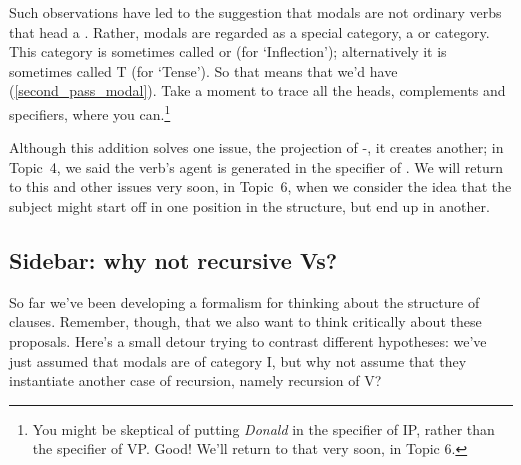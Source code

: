 \documentclass{article}
\begin{document}
Such observations have led to the suggestion that modals are not ordinary verbs that head a .
Rather, modals are regarded as a special category, a  or  category.
This category is sometimes called  or  (for `Inflection');  alternatively it is sometimes called T (for `Tense').
So that means that
we'd have (\ref{second_pass_modal}). Take a moment to trace all the heads, complements and specifiers, where you can.\footnote{You might be skeptical of putting \emph{Donald} in the specifier of IP, rather than the specifier of VP. Good! We'll return to that very soon, in Topic 6.}
\begin{exe}
    \label{second_pass_modal}
\end{exe}
Although this addition solves one issue, the projection of -, it creates another; in Topic~4, we said the verb's agent is generated in the specifier of .
We will return to this and other issues very soon, in Topic~6, when we consider the idea that the subject might start off in one position in the structure, but end up in another.

    \subsection{Sidebar: why not recursive Vs?}
So far we've been developing a formalism for thinking about the structure of clauses. Remember, though, that we also want to think critically about these proposals. Here's a small detour trying to contrast different hypotheses: we've just assumed that modals are of category I, but why not assume that they instantiate another case of recursion, namely recursion of V?
 
\end{document}
